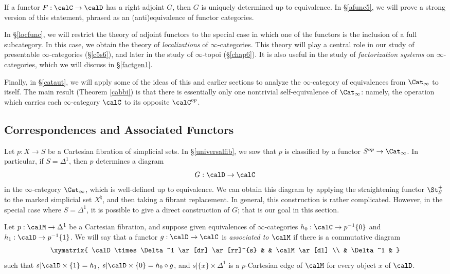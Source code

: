 If a functor $F: \calC \rightarrow \calD$ has a right adjoint $G$, then $G$ is uniquely determined up to equivalence. In \S \ref{afunc5}, we will prove a strong version of this statement, phrased as an (anti)equivalence of functor categories.

In \S \ref{locfunc}, we will restrict the theory of adjoint functors to the special case in which one of the functors is the inclusion of a full subcategory. In this case, we obtain the theory of {\em localizations} of $\infty$-categories. This theory will play a central role in our study of presentable $\infty$-categories (\S \ref{c5s6}), and later in the study of $\infty$-topoi (\S \ref{chap6}). It is also useful in the study of {\it factorization systems} on $\infty$-categories, which we will discuss in
\S \ref{factgen1}.

Finally, in \S \ref{cataut}, we will apply some of the ideas of this and earlier sections to analyze the $\infty$-category of equivalences from $\Cat_{\infty}$ to itself. The main result (Theorem \ref{cabbi}) is that there is essentially only one nontrivial self-equivalence of $\Cat_{\infty}$: namely, the operation which carries each $\infty$-category $\calC$ to its opposite $\calC^{op}$.

\subsection{Correspondences and Associated Functors}\label{afunc1}

Let $p: X \rightarrow S$ be a Cartesian fibration of simplicial sets. In \S \ref{universalfib}, we
saw that $p$ is classified by a functor $S^{op} \rightarrow \Cat_{\infty}$. In particular, if
$S = \Delta^1$, then $p$ determines a diagram
$$ G: \calD \rightarrow \calC$$
in the $\infty$-category $\Cat_{\infty}$, which is well-defined up to equivalence.
We can obtain this diagram by applying the straightening
functor $\St_{S}^{+}$ to the marked simplicial set $X^{\natural}$, and then taking a fibrant replacement. In general, this construction is rather complicated. However, in the special case where
$S = \Delta^1$, it is possible to give a direct construction of $G$; that is our goal in this section.

\begin{definition}\label{fibas}
Let $p: \calM \rightarrow \Delta^1$ be a Cartesian fibration, and suppose given
equivalences of $\infty$-categories $h_0: \calC \rightarrow p^{-1} \{0\}$ and $h_1: \calD \rightarrow p^{-1} \{1\}$. We will say that a functor $g: \calD \rightarrow \calC$ is {\it associated to $\calM$} if
there is a commutative diagram
$$ \xymatrix{ \calD \times \Delta^1 \ar[dr] \ar[rr]^{s} & & \calM \ar[dl] \\
& \Delta^1 & }$$
such that $s| \calD \times \{1\} = h_1$, $s| \calD \times \{0\} = h_0 \circ g$, and
$s| \{x\} \times \Delta^1$ is a $p$-Cartesian edge of $\calM$ for every object $x$ of $\calD$.
\end{definition}


